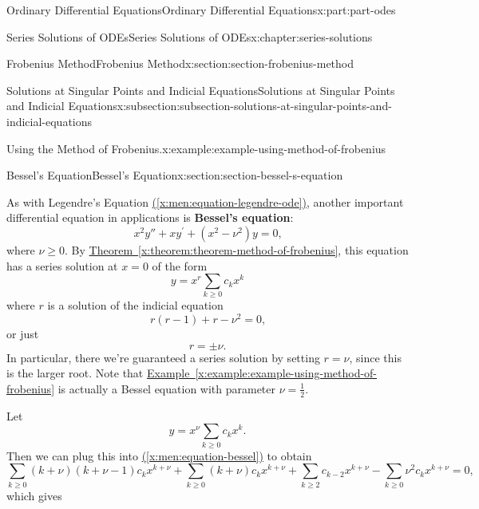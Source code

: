 \documentclass[oneside,10pt,]{book}
\newcommand{\xreffont}{\relax}
\newcommand{\terminology}[1]{\textbf{#1}}
\numberwithin{equation}{part}
\begin{document}
\begin{partptx}{Ordinary Differential Equations}{}{Ordinary Differential Equations}{}{}{x:part:part-odes}
\begin{chapterptx}{Series Solutions of ODEs}{}{Series Solutions of ODEs}{}{}{x:chapter:series-solutions}
\begin{sectionptx}{Frobenius Method}{}{Frobenius Method}{}{}{x:section:section-frobenius-method}
\begin{subsectionptx}{Solutions at Singular Points and Indicial Equations}{}{Solutions at Singular Points and Indicial Equations}{}{}{x:subsection:subsection-solutions-at-singular-points-and-indicial-equations}
\begin{example}{Using the Method of Frobenius.}{x:example:example-using-method-of-frobenius}
%
\end{example}
\end{subsectionptx}
\end{sectionptx}
%
%
\typeout{************************************************}
\typeout{************************************************}
%
\begin{sectionptx}{Bessel's Equation}{}{Bessel's Equation}{}{}{x:section:section-bessel-s-equation}
\begin{introduction}{}%
As with Legendre's Equation \hyperref[x:men:equation-legendre-ode]{({\xreffont\ref{x:men:equation-legendre-ode}})}, another important differential equation in applications is \terminology{Bessel's equation}:%
\begin{equation}
x^{2}y'' + xy^\prime + (x^{2} - \nu^{2})y = 0\text{,}\label{x:men:equation-bessel}
\end{equation}
where \(\nu \geq 0\). By \hyperref[x:theorem:theorem-method-of-frobenius]{Theorem~{\xreffont\ref{x:theorem:theorem-method-of-frobenius}}}, this equation has a series solution at \(x = 0\) of the form%
\begin{equation*}
y = x^{r}\sum_{k\geq0}c_{k}x^{k}
\end{equation*}
where \(r\) is a solution of the indicial equation%
\begin{equation*}
r(r - 1) + r - \nu^{2} = 0\text{,}
\end{equation*}
or just%
\begin{equation*}
r = \pm\nu\text{.}
\end{equation*}
In particular, there we're guaranteed a series solution by setting \(r = \nu\), since this is the larger root. Note that \hyperref[x:example:example-using-method-of-frobenius]{Example~{\xreffont\ref{x:example:example-using-method-of-frobenius}}} is actually a Bessel equation with parameter \(\nu = \frac{1}{2}\).%
\par
Let%
\begin{equation*}
y = x^{\nu}\sum_{k\geq0}c_{k}x^{k}\text{.}
\end{equation*}
Then we can plug this into \hyperref[x:men:equation-bessel]{({\xreffont\ref{x:men:equation-bessel}})} to obtain%
\begin{equation}
\sum_{k\geq0}(k+\nu)(k+\nu-1)c_{k}x^{k + \nu} + \sum_{k\geq0}(k+\nu)c_{k}x^{k + \nu} + \sum_{k\geq2}c_{k-2}x^{k + \nu} - \sum_{k\geq0}\nu^{2}c_{k}x^{k + \nu} = 0\text{,}\label{x:men:equation-bessel-plugged-in}
\end{equation}
which gives%

\end{introduction}
\end{sectionptx}
\end{chapterptx}
\end{partptx}
\end{document}
